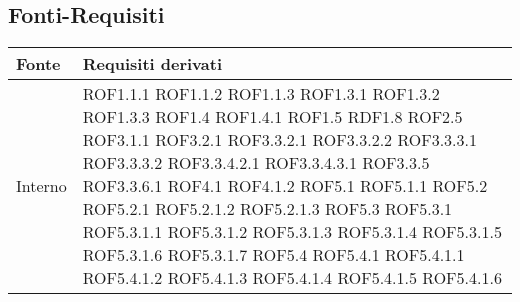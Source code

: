 \subsection{Fonti-Requisiti} %
\label{ssub:fonti_requisiti}
\begin{center}
\def\arraystretch{1.5}
\bgroup
\begin{longtable}{| p{4cm} | p{4cm} |}
\hline
\textbf{Fonte} & \textbf{Requisiti derivati} \\
\hline
Interno & ROF1.1.1 \newline ROF1.1.2 \newline ROF1.1.3 \newline ROF1.3.1 \newline ROF1.3.2 \newline ROF1.3.3 \newline ROF1.4 \newline ROF1.4.1 \newline ROF1.5 \newline RDF1.8 \newline ROF2.5 \newline ROF3.1.1 \newline ROF3.2.1 \newline ROF3.3.2.1 \newline ROF3.3.2.2 \newline ROF3.3.3.1 \newline ROF3.3.3.2 \newline ROF3.3.4.2.1 \newline ROF3.3.4.3.1 \newline ROF3.3.5 \newline ROF3.3.6.1 \newline ROF4.1 \newline ROF4.1.2 \newline ROF5.1 \newline ROF5.1.1 \newline ROF5.2 \newline ROF5.2.1 \newline ROF5.2.1.2 \newline ROF5.2.1.3 \newline ROF5.3 \newline ROF5.3.1 \newline ROF5.3.1.1 \newline ROF5.3.1.2 \newline ROF5.3.1.3 \newline ROF5.3.1.4 \newline ROF5.3.1.5 \newline ROF5.3.1.6 \newline ROF5.3.1.7 \newline ROF5.4 \newline ROF5.4.1 \newline ROF5.4.1.1 \newline ROF5.4.1.2 \newline ROF5.4.1.3 \newline ROF5.4.1.4 \newline ROF5.4.1.5 \newline ROF5.4.1.6 \\

\end{longtable}
\end{center}
